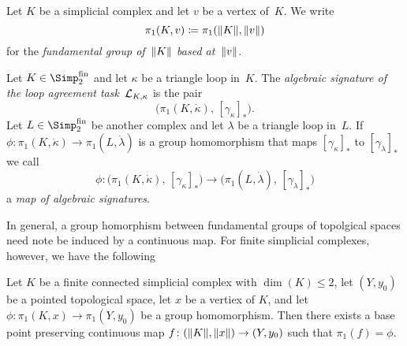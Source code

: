 \begin{thConvention}
    Let $K$ be a simplicial complex and let $v$ be a vertex of~$K$.
    We write
    \[ \pi_1(K,v) \coloneqq \pi_1(\lVert K\rVert, \lVert v\rVert) \]
    for the \emph{fundamental group of~$\lVert K\rVert$ based at~$\lVert v\rVert$}.
\end{thConvention}

\begin{thDef}
    Let $K\in\finSimp$ and let $\kappa$ be a triangle loop in~$K$. The
    \emph{algebraic signature of the loop agreement task~$\mathcal{L}_{K,\kappa}$}
    is the pair
    \[ \bigl( \pi_1(K,\dot\kappa), \, [\gamma_\kappa]_\ast \bigr) . \]
    Let $L\in\finSimp$ be another complex and let $\lambda$ be a triangle loop
    in~$L$. If $\phi\colon\pi_1(K,\dot\kappa)\to\pi_1(L,\dot\lambda)$ is a
    group homomorphism that maps $[\gamma_\kappa]_\ast$ to
    $[\gamma_\lambda]_\ast$ we call
    \[ \phi\colon \bigl( \pi_1(K,\dot\kappa), \, [\gamma_\kappa]_\ast \bigr)
        \to \bigl( \pi_1(L,\dot\lambda), \, [\gamma_\lambda]_\ast \bigr)
    \]
    a \emph{map of algebraic signatures}.
\end{thDef}

In general, a group homorphism between fundamental groups of topolgical spaces
need note be induced by a continuous map. For finite simplicial complexes,
however, we have the following

\begin{thLemma}
    \label{ch3:continuousrealization}
    Let $K$ be a finite connected simplicial complex with $\dim(K)\leq 2$,
    let $(Y,y_0)$ be a pointed topological space, let $x$ be a vertiex of $K$,
    and let $\phi\colon\pi_1(K,x)\to\pi_1(Y,y_0)$ be a group homomorphism.
    Then there exists a base point preserving continuous map
    $f\colon(\lVert K\rVert,\lVert x\rVert)\to(Y,y_0)$ such that $\pi_1(f) = \phi$.
\end{thLemma}

